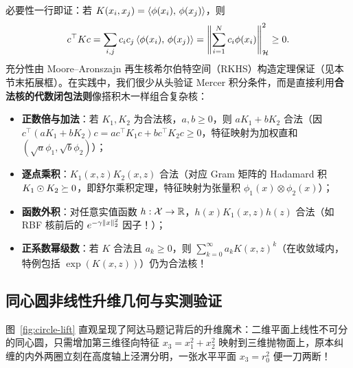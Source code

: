 必要性一行即证：若 $K(x_i, x_j) = \left\langle \phi(x_i),\, \phi(x_j) \right\rangle$，则
\[
  c^\top K c = \sum_{i,j} c_i c_j \left\langle \phi(x_i),\, \phi(x_j) \right\rangle = \left\|\sum_{i=1}^{N} c_i \phi(x_i)\right\|_{\mathcal{H}}^2 \ge 0.
\]
充分性由 Moore--Aronszajn 再生核希尔伯特空间（RKHS）构造定理保证（见本节末拓展框）。在实践中，我们很少从头验证 Mercer 积分条件，而是直接利用\textbf{合法核的代数闭包法则}像搭积木一样组合复杂核：
\begin{itemize}
  \item \textbf{正数倍与加法}：若 $K_1, K_2$ 为合法核，$a, b \ge 0$，则 $a K_1 + b K_2$ 合法（因 $c^\top(a K_1 + b K_2)c = a c^\top K_1 c + b c^\top K_2 c \ge 0$，特征映射为加权直和 $(\sqrt{a}\phi_1, \sqrt{b}\phi_2)$）；
  \item \textbf{逐点乘积}：$K_1(x, z) K_2(x, z)$ 合法（对应 Gram 矩阵的 Hadamard 积 $K_1 \odot K_2 \succeq 0$，即舒尔乘积定理，特征映射为张量积 $\phi_1(x) \otimes \phi_2(x)$）；
  \item \textbf{函数外积}：对任意实值函数 $h: \mathcal{X} \to \mathbb{R}$，$h(x) K_1(x, z) h(z)$ 合法（如 RBF 核前后的 $e^{-\gamma\left\|x\right\|_2^2}$ 因子！）；
  \item \textbf{正系数幂级数}：若 $K$ 合法且 $a_k \ge 0$，则 $\sum_{k=0}^{\infty} a_k K(x, z)^k$（在收敛域内，特例包括 $\exp(K(x, z))$）仍为合法核！
\end{itemize}

\subsection{同心圆非线性升维几何与实测验证}

图~\ref{fig:circle-lift} 直观呈现了阿达马题记背后的升维魔术：二维平面上线性不可分的同心圆，只需增加第三维径向特征 $x_3 = x_1^2 + x_2^2$ 映射到三维抛物面上，原本纠缠的内外两圈立刻在高度轴上泾渭分明，一张水平平面 $x_3 = r_0^2$ 便一刀两断！

